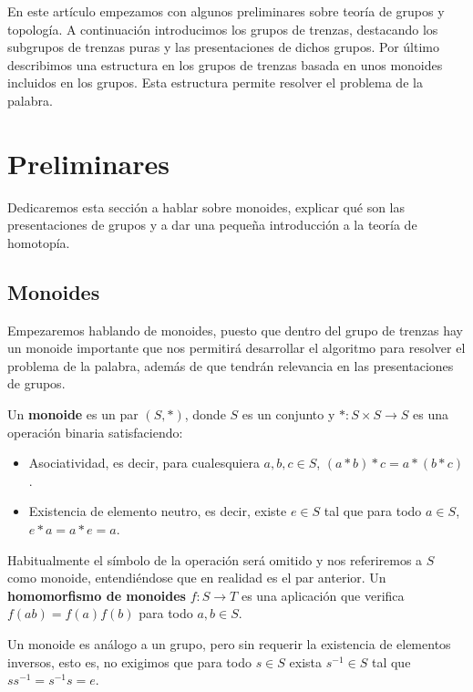 \documentclass[bibtex, anon]{TEMat-article}
\begin{document}
En este artículo empezamos con algunos preliminares sobre teoría de grupos y topología. A continuación introducimos los grupos de trenzas, destacando los subgrupos de trenzas puras y las presentaciones de dichos grupos. Por último describimos una estructura en los grupos de trenzas basada en unos monoides incluidos en los grupos. Esta estructura permite resolver el problema de la palabra.


\section{Preliminares}

Dedicaremos esta sección a hablar sobre monoides, explicar qué son las presentaciones de grupos y a dar una pequeña introducción a la teoría de homotopía. 

\subsection{Monoides}

Empezaremos hablando de monoides, puesto que dentro del grupo de trenzas hay un monoide importante que nos permitirá desarrollar el algoritmo para resolver el problema de la palabra, además de que tendrán relevancia en las presentaciones de grupos.



\begin{definicion}
	Un \textbf{monoide} es un par $(S,*)$, donde $S$ es un conjunto y $*:S\times S\to S$ es una operación binaria satisfaciendo:
	\begin{itemize}
		\item Asociatividad, es decir, para cualesquiera $a,b,c\in S$, $(a*b)*c=a*(b*c)$.
		\item Existencia de elemento neutro, es decir, existe $e\in S$ tal que para todo $a\in S$, $e*a=a*e=a$. 
	\end{itemize}
	Habitualmente el símbolo de la operación será omitido y nos referiremos a $S$ como monoide, entendiéndose que en realidad es el par anterior. Un \textbf{homomorfismo de monoides} $f:S\to T$ es una aplicación que verifica $f(ab)=f(a)f(b)$ para todo $a,b\in S$. 
\end{definicion}

\begin{observacion}
	Un monoide es análogo a un grupo, pero sin requerir la existencia de elementos inversos, esto es, no exigimos que para todo $s\in S$ exista $s^{-1}\in S$ tal que $ss^{-1}=s^{-1}s=e$.
\end{observacion}
\end{document}
